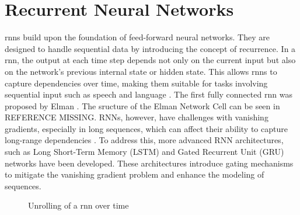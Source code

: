 \documentclass[12pt, a4paper, headinclude, twoside, plainheadsepline, open=right, numbers=noenddot, hidelinks, toc=listof, toc=bibliography]{scrreprt}
\begin{document}
\section{Recurrent Neural Networks}
\label{sec:rnn}
\Acp{rnn} build upon the foundation of feed-forward neural networks. They are designed to handle sequential data by introducing the concept of recurrence. In a \ac{rnn}, the output at each time step depends not only on the current input but also on the network's previous internal state or hidden state. This allows \acp{rnn} to capture dependencies over time, making them suitable for tasks involving sequential input such as speech and language \cite{lecunDeepLearning2015}.
The first fully connected \ac{rnn} was proposed by Elman \cite{elmanFindingStructureTime1990}.
The sructure of the Elman Network Cell can be seen in REFERENCE MISSING.
RNNs, however, have challenges with vanishing gradients, especially in long sequences, which can affect their ability to capture long-range dependencies \cite{sutskeverTrainingRecurrentNeural2013}. To address this, more advanced RNN architectures, such as Long Short-Term Memory (LSTM) and Gated Recurrent Unit (GRU) networks have been developed. These architectures introduce gating mechanisms to mitigate the vanishing gradient problem and enhance the modeling of sequences.

\begin{figure}
\centering
\label{fig:rnn_unroll}
\caption{Unrolling of a \ac{rnn} over time}

\end{figure}
\end{document}
